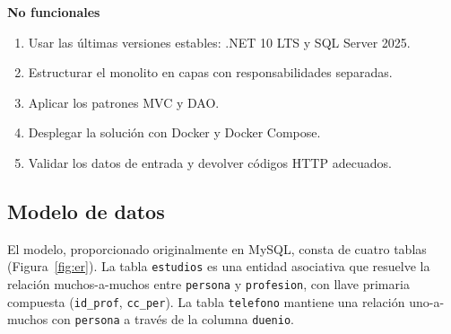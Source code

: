 \documentclass[12pt,letterpaper]{article}
\begin{document}
\textbf{No funcionales}
\begin{enumerate}[label=RNF\arabic*., itemsep=2pt]
  \item Usar las últimas versiones estables: .NET 10 LTS y SQL Server 2025.
  \item Estructurar el monolito en capas con responsabilidades separadas.
  \item Aplicar los patrones MVC y DAO.
  \item Desplegar la solución con Docker y Docker Compose.
  \item Validar los datos de entrada y devolver códigos HTTP adecuados.
\end{enumerate}

\subsection{Modelo de datos}

El modelo, proporcionado originalmente en MySQL, consta de cuatro tablas
(Figura~\ref{fig:er}). La tabla \texttt{estudios} es una entidad asociativa que resuelve
la relación muchos-a-muchos entre \texttt{persona} y \texttt{profesion}, con llave
primaria compuesta (\texttt{id\_prof}, \texttt{cc\_per}). La tabla \texttt{telefono}
mantiene una relación uno-a-muchos con \texttt{persona} a través de la columna
\texttt{duenio}.
\end{document}
